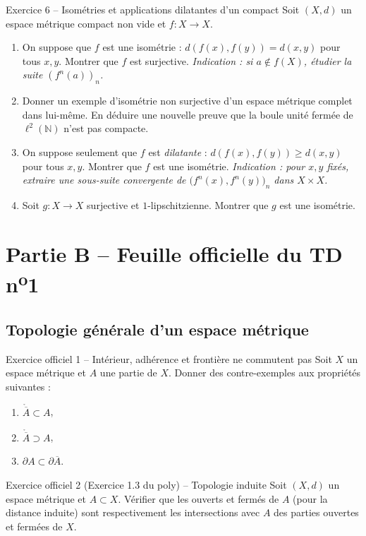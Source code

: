 \documentclass[11pt,a4paper]{article}
\newcommand{\N}{\mathbb{N}}
\newcommand{\interieur}[1]{\mathring{#1}}
\newcommand{\adh}[1]{\overline{#1}}
\theoremstyle{definition}
\begin{document}
\begin{exo}{Exercice 6 -- Isométries et applications dilatantes d'un compact}
Soit $(X,d)$ un espace métrique compact non vide et $f:X\to X$.
\begin{enumerate}[label=(\alph*)]
  \item On suppose que $f$ est une isométrie : $d(f(x),f(y))=d(x,y)$ pour tous $x,y$. Montrer que $f$ est surjective. \emph{Indication : si $a\notin f(X)$, étudier la suite $(f^n(a))_n$.}
  \item Donner un exemple d'isométrie non surjective d'un espace métrique complet dans lui-même. En déduire une nouvelle preuve que la boule unité fermée de $\ell^2(\N)$ n'est pas compacte.
  \item On suppose seulement que $f$ est \emph{dilatante} : $d(f(x),f(y))\ge d(x,y)$ pour tous $x,y$. Montrer que $f$ est une isométrie. \emph{Indication : pour $x,y$ fixés, extraire une sous-suite convergente de $\big(f^n(x),f^n(y)\big)_n$ dans $X\times X$.}
  \item Soit $g:X\to X$ surjective et $1$-lipschitzienne. Montrer que $g$ est une isométrie.
\end{enumerate}
\end{exo}

\section*{Partie B -- Feuille officielle du TD n\textsuperscript{o}1}

\subsection*{Topologie générale d'un espace métrique}

\begin{exo}{Exercice officiel 1 -- Intérieur, adhérence et frontière ne commutent pas}
Soit $X$ un espace métrique et $A$ une partie de $X$. Donner des contre-exemples aux propriétés suivantes :
\begin{enumerate}[label=\arabic*.]
  \item $\interieur{\adh{A}} \subset A$,
  \item $\interieur{\adh{A}} \supset A$,
  \item $\partial A \subset \partial \adh{A}$.
\end{enumerate}
\end{exo}

\begin{exo}{Exercice officiel 2 (Exercice 1.3 du poly) -- Topologie induite}
Soit $(X,d)$ un espace métrique et $A\subset X$. Vérifier que les ouverts et fermés de $A$ (pour la distance induite) sont respectivement les intersections avec $A$ des parties ouvertes et fermées de $X$.
\end{exo}
\end{document}
